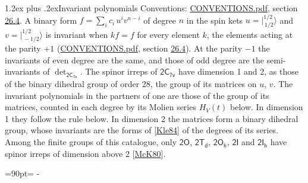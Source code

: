 \documentclass[10pt,a4paper]{article}
\makeatletter
\renewcommand\section{\@startsection{section}{1}{\z@}{-3ex plus -1ex minus -.2ex}%
  {1.2ex plus .2ex}{\normalfont\large\sffamily\bfseries\color{parttitle}}}
\newcommand{\needspace}[1]{\par\penalty-100\begingroup\dimen0=#1\relax\dimen2=\pagegoal
  \advance\dimen2-\pagetotal\ifdim\dimen0>\dimen2\relax\ifdim\dimen2>0pt\vfil\break\fi\fi
  \endgroup}
\numberwithin{equation}{section}
\newcommand{\grp}[1]{\mathsf{#1}}
\newcommand{\jm}[2]{\bigl\lvert{}^{#1}_{\,#2}\bigr\rangle}
\makeatother
\begin{document}
\section{Invariant polynomials}\label{s:invariants}
Conventions: \href{../../CONVENTIONS.pdf}{CONVENTIONS.pdf}, section \href{../../CONVENTIONS.pdf\#conv.26.4}{26.4}.
\leavevmode\label{n:local.binary.form}A binary form $f = \sum_i c_i\, u^i v^{n-i}$ of degree $n$ in the spin kets $u = \jm{1/2}{1/2}$ and $v = \jm{1/2}{-1/2}$ is invariant when $k f = f$ for every element $k$, the elements acting at the parity $+1$ (\href{../../CONVENTIONS.pdf}{CONVENTIONS.pdf}, section \href{../../CONVENTIONS.pdf\#conv.26.4}{26.4}). At the parity $-1$ the invariants of even degree are the same, and those of odd degree are the semi-invariants of $\det_{\grp{2C_{7v}}}$.
The spinor irreps of $\grp{2C_{7v}}$ have dimension 1 and 2, as those of the binary dihedral group of order 28, the group of its matrices on $u$, $v$. \label{n:function.hilbert}The invariant polynomials in the partners of one are those of the group of its matrices, counted in each degree by its Molien series $H_V(t)$ below. In dimension 1 they follow the rule below. In dimension 2 the matrices form a binary dihedral group, whose invariants are the forms of [\href{../../../REFERENCES.pdf\#ref.Kle84}{Kle84}] of the degrees of its series. Among the finite groups of this catalogue, only $\grp{2O}$, $\grp{2T_{d}}$, $\grp{2O_{h}}$, $\grp{2I}$ and $\grp{2I_{h}}$ have spinor irreps of dimension above 2 [\href{../../../REFERENCES.pdf\#ref.McK80}{McK80}].
\needspace{90pt}
\end{document}
